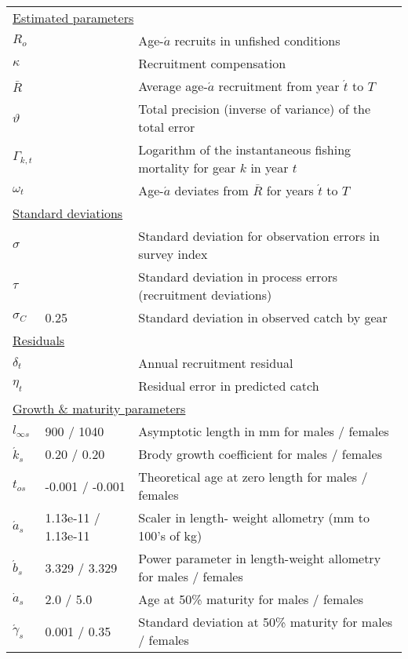 \documentclass[11pt]{article}   %
\def\newp{\vfill \break}
\begin{document}
\begin{tabular}{lll}
\multicolumn{3}{l}{\underline{Estimated parameters}}\\
$R_o$               & & Age-$\acute{a}$ recruits in unfished conditions\\
$\kappa$            & & Recruitment compensation\\
$\bar{R}$           & & Average age-$\acute{a}$ recruitment from year $\acute{t}$ to $T$\\
$\vartheta$         & & Total precision (inverse of variance) of the total error\\
$\Gamma_{k,t}$    & & Logarithm of the instantaneous fishing mortality for gear $k$ in year $t$\\
$\omega_t$          & & Age-$\acute{a}$ deviates from $\bar{R}$ for years $\acute{t}$ to $T$\\
\multicolumn{3}{l}{\underline{Standard deviations}}\\
$\sigma$            &       & Standard deviation for observation errors in survey index\\
$\tau$              &       & Standard deviation in process errors (recruitment deviations)\\
$\sigma_C$          &0.25 & Standard deviation in observed catch by gear\\
\multicolumn{3}{l}{\underline{Residuals}}\\
$\delta_t$      &   & Annual recruitment residual\\
$\eta_t$        &   & Residual error in predicted catch\\
\multicolumn{3}{l}{\underline{Growth \& maturity parameters}}\\
$l_{\infty  s}$ &  900 / 1040 &  Asymptotic length in mm for males / females \\
$\acute{k}_s$ & 0.20 / 0.20 & Brody growth coefficient for males / females \\
$t_{o s}$ & -0.001 / -0.001 & Theoretical age at zero length for males / females \\
$\acute{a}_s$ & 1.13e{-11} / 1.13e{-11} &  Scaler in length- weight allometry (mm to 100's of kg)\\
$\acute{b}_s$ & 3.329 / 3.329 &Power parameter in length-weight allometry for males / females\\
$\dot{a}_s$ & 2.0 / 5.0 & Age at 50\% maturity for males / females \\
$\acute{\gamma}_s$ & 0.001 / 0.35 & Standard deviation at 50\% maturity for males / females\\
\hline
\end{tabular}
\newp %
\end{document}

